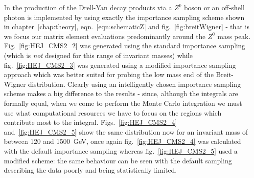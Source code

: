 		In \HEJ the production of the Drell-Yan decay products via a $Z^0$ boson or an off-shell photon
		is implemented by using exactly the importance sampling scheme shown in chapter~\ref{chap:theory},
		eqn.~\eqref{eqn:schematicZ} and fig.~\eqref{fig:breitWigner} - that is we focus our matrix element
		evaluations predominantly around the $Z^0$ mass peak.  Fig.~\eqref{fig:HEJ_CMS2_2} was
		generated using the standard importance sampling (which is \emph{not} designed for this range of invariant masses) while
		fig.~\eqref{fig:HEJ_CMS2_3} was generated using a modified importance
		sampling approach which was better suited for probing the low mass end of the Breit-Wigner
		distribution.  Clearly using an intelligently chosen importance sampling scheme makes a big
		difference to the results - since, although the integrals are formally equal, when we come to
		perform the Monte Carlo integration we must use what computational resources we have to focus on
		the regions which contribute most to the integral.  Figs.~\eqref{fig:HEJ_CMS2_4}
		and~\eqref{fig:HEJ_CMS2_5} show the same distribution now for an invariant mass of between 120
		and 1500~GeV, once again fig.~\eqref{fig:HEJ_CMS2_4} was calculated with the default importance
		sampling whereas fig.~\eqref{fig:HEJ_CMS2_5} used a modified scheme:  the same behaviour can be
		seen with the default sampling describing the data poorly and being statistically limited.

